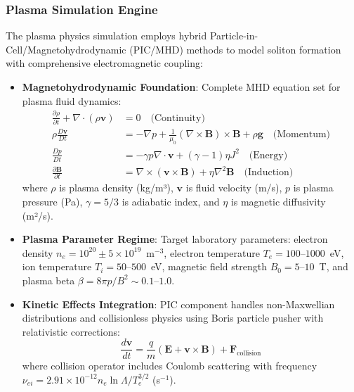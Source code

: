\documentclass[12pt,a4paper]{article}
\begin{document}
\subsubsection{Plasma Simulation Engine}

The plasma physics simulation employs hybrid Particle-in-Cell/Magnetohydrodynamic (PIC/MHD) methods to model soliton formation with comprehensive electromagnetic coupling:

\begin{itemize}
\item \textbf{Magnetohydrodynamic Foundation}: Complete MHD equation set for plasma fluid dynamics:
\begin{align}
\frac{\partial \rho}{\partial t} + \nabla \cdot (\rho \mathbf{v}) &= 0 \quad \text{(Continuity)} \\
\rho \frac{D\mathbf{v}}{Dt} &= -\nabla p + \frac{1}{\mu_0}(\nabla \times \mathbf{B}) \times \mathbf{B} + \rho \mathbf{g} \quad \text{(Momentum)} \\
\frac{Dp}{Dt} &= -\gamma p \nabla \cdot \mathbf{v} + (\gamma - 1) \eta J^2 \quad \text{(Energy)} \\
\frac{\partial \mathbf{B}}{\partial t} &= \nabla \times (\mathbf{v} \times \mathbf{B}) + \eta \nabla^2 \mathbf{B} \quad \text{(Induction)}
\end{align}
where $\rho$ is plasma density (kg/m³), $\mathbf{v}$ is fluid velocity (m/s), $p$ is plasma pressure (Pa), $\gamma = 5/3$ is adiabatic index, and $\eta$ is magnetic diffusivity (m²/s).

\item \textbf{Plasma Parameter Regime}: Target laboratory parameters: electron density $n_e = 10^{20} \pm 5 \times 10^{19}$~m$^{-3}$, electron temperature $T_e = 100$--$1000$~eV, ion temperature $T_i = 50$--$500$~eV, magnetic field strength $B_0 = 5$--$10$~T, and plasma beta $\beta = 8\pi p / B^2 \sim 0.1$--$1.0$.

\item \textbf{Kinetic Effects Integration}: PIC component handles non-Maxwellian distributions and collisionless physics using Boris particle pusher with relativistic corrections:
\begin{equation}
\frac{d\mathbf{v}}{dt} = \frac{q}{m}\left(\mathbf{E} + \mathbf{v} \times \mathbf{B}\right) + \mathbf{F}_{\text{collision}}
\end{equation}
where collision operator includes Coulomb scattering with frequency $\nu_{ei} = 2.91 \times 10^{-12} n_e \ln\Lambda / T_e^{3/2}$ (s$^{-1}$).


\end{itemize}
\end{document}

